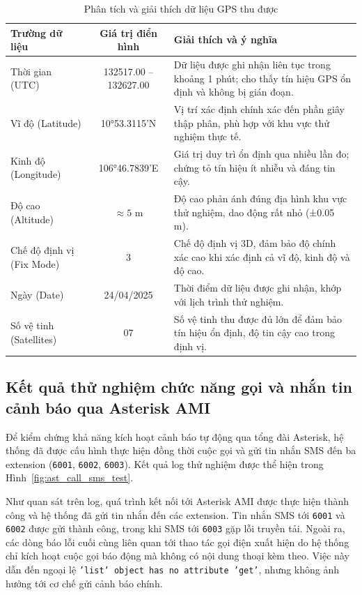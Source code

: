 \begin{table}[H]
\centering
\caption{Phân tích và giải thích dữ liệu GPS thu được}
\label{tab:gps_analysis}
\begin{tabular}{|l|c|p{8.5cm}|}
\hline
\textbf{Trường dữ liệu} & \textbf{Giá trị điển hình} & \textbf{Giải thích và ý nghĩa} \\
\hline
Thời gian (UTC) & 132517.00 -- 132627.00 & Dữ liệu được ghi nhận liên tục trong khoảng 1 phút; cho thấy tín hiệu GPS ổn định và không bị gián đoạn. \\
\hline
Vĩ độ (Latitude) & 10°53.3115'N & Vị trí xác định chính xác đến phần giây thập phân, phù hợp với khu vực thử nghiệm thực tế. \\
\hline
Kinh độ (Longitude) & 106°46.7839'E & Giá trị duy trì ổn định qua nhiều lần đo; chứng tỏ tín hiệu ít nhiễu và đáng tin cậy. \\
\hline
Độ cao (Altitude) & $\approx 5$ m & Độ cao phản ánh đúng địa hình khu vực thử nghiệm, dao động rất nhỏ (±0.05 m). \\
\hline
Chế độ định vị (Fix Mode) & 3 & Chế độ định vị 3D, đảm bảo độ chính xác cao khi xác định cả vĩ độ, kinh độ và độ cao. \\
\hline
Ngày (Date) & 24/04/2025 & Thời điểm dữ liệu được ghi nhận, khớp với lịch trình thử nghiệm. \\
\hline
Số vệ tinh (Satellites) & 07 & Số vệ tinh thu được đủ lớn để đảm bảo tín hiệu ổn định, độ tin cậy cao trong định vị. \\
\hline
\end{tabular}
\end{table}

\subsection{Kết quả thử nghiệm chức năng gọi và nhắn tin cảnh báo qua Asterisk AMI}
\label{subsec:ast_call_sms_test}

Để kiểm chứng khả năng kích hoạt cảnh báo tự động qua tổng đài Asterisk, hệ thống đã được cấu hình thực hiện đồng thời cuộc gọi và gửi tin nhắn SMS đến ba extension (\texttt{6001}, \texttt{6002}, \texttt{6003}). Kết quả log thử nghiệm được thể hiện trong Hình~\ref{fig:ast_call_sms_test}.

Như quan sát trên log, quá trình kết nối tới Asterisk AMI được thực hiện thành công và hệ thống đã gửi tin nhắn đến các extension. Tin nhắn SMS tới \texttt{6001} và \texttt{6002} được gửi thành công, trong khi SMS tới \texttt{6003} gặp lỗi truyền tải. Ngoài ra, các dòng báo lỗi cuối cùng liên quan tới thao tác gọi điện xuất hiện do hệ thống chỉ kích hoạt cuộc gọi báo động mà không có nội dung thoại kèm theo. Việc này dẫn đến ngoại lệ \texttt{'list' object has no attribute 'get'}, nhưng không ảnh hưởng tới cơ chế gửi cảnh báo chính.

